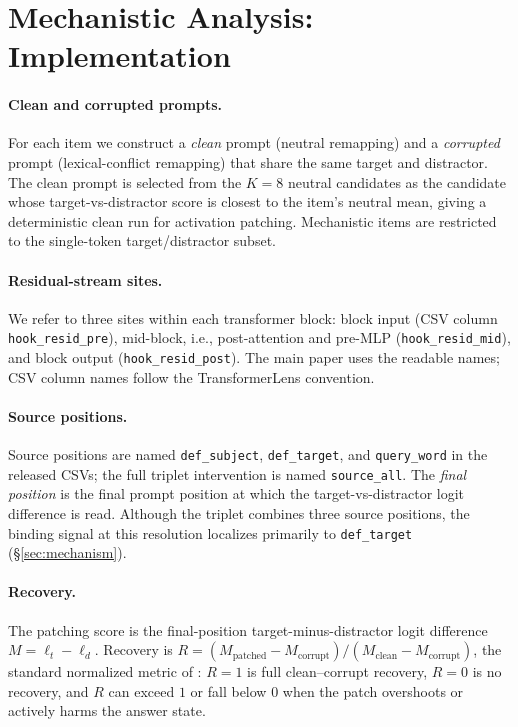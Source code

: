 \documentclass[11pt]{article}
\newcommand{\sourceall}{\texttt{source\_all}\xspace}
\begin{document}
\FloatBarrier
\section{Mechanistic Analysis: Implementation}
\label{app:mech_impl}

\paragraph{Clean and corrupted prompts.}
For each item we construct a \emph{clean} prompt (neutral remapping) and a \emph{corrupted}
prompt (lexical-conflict remapping) that share the same target and distractor. The clean prompt
is selected from the $K{=}8$ neutral candidates as the candidate whose target-vs-distractor
score is closest to the item's neutral mean, giving a deterministic clean run for activation
patching. Mechanistic items are restricted to the single-token target/distractor subset.

\paragraph{Residual-stream sites.}
We refer to three sites within each transformer block: block input (CSV column
\texttt{hook\_resid\_pre}), mid-block, i.e., post-attention and pre-MLP
(\texttt{hook\_resid\_mid}), and block output (\texttt{hook\_resid\_post}). The main paper
uses the readable names; CSV column names follow the TransformerLens convention.

\paragraph{Source positions.}
Source positions are named \texttt{def\_subject}, \texttt{def\_target}, and
\texttt{query\_word} in the released CSVs; the full triplet intervention is named
\sourceall. The \emph{final position} is the final prompt position at which the
target-vs-distractor logit difference is read. Although the triplet combines three source
positions, the binding signal at this resolution localizes primarily to \texttt{def\_target}
(\S\ref{sec:mechanism}).

\paragraph{Recovery.}
The patching score is the final-position target-minus-distractor logit difference
$M = \ell_t - \ell_d$. Recovery is
$R = (M_{\text{patched}} - M_{\text{corrupt}}) / (M_{\text{clean}} - M_{\text{corrupt}})$,
the standard normalized metric of \citet{zhang2024towards}: $R{=}1$ is full clean--corrupt
recovery, $R{=}0$ is no recovery, and $R$ can exceed $1$ or fall below $0$ when the patch
overshoots or actively harms the answer state.
\end{document}
